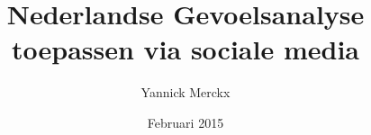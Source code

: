\documentclass[a4paper,12pt]{report}
\author{Yannick Merckx}
\title{Nederlandse Gevoelsanalyse toepassen via sociale media}
\date{Februari 2015}
\begin{document}
\maketitlepage

\setlength{\arrayrulewidth}{0.1mm}

\newpage
%

\renewcommand{\contentsname}{Inhoud}
\tableofcontents
\end{document}
